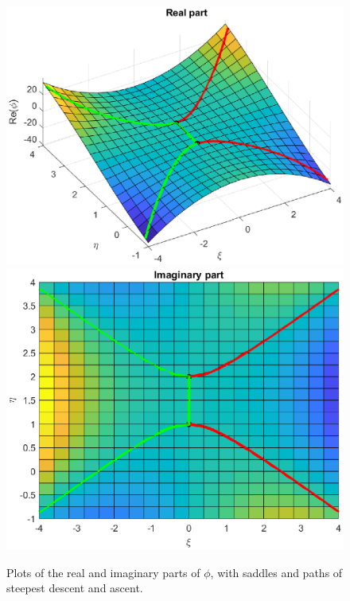 \documentclass{X:/Documents/Coding/Latex/myassignment}
\begin{document}
\begin{enumerate}
\begin{enumerate}
		\begin{figure}[h]
			\centering
			\includegraphics[width=0.8\linewidth]{TopicCA5Q1real.eps}
			\includegraphics[width=0.8\linewidth]{TopicCA5Q1imag.eps}
			\caption{Plots of the real and imaginary parts of $\phi$, with saddles and paths of steepest descent and ascent.}
			\label{fig:q1}
		\end{figure}


\end{enumerate}
\end{enumerate}
\end{document}
